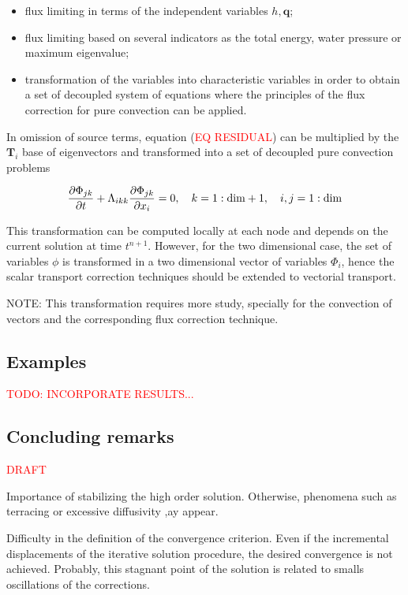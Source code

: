 \begin{itemize}
    \item flux limiting in terms of the independent variables $h, \mathbf{q}$;
    \item flux limiting based on several indicators as the total energy, water pressure or maximum eigenvalue;
    \item transformation of the variables into characteristic variables in order to obtain a set of decoupled system of equations where the principles of the flux correction for pure convection can be applied.
\end{itemize}

In omission of source terms, equation (\textcolor{red}{EQ RESIDUAL}) can be multiplied by the $\mathbf{T}_i$ base of eigenvectors and transformed into a set of decoupled pure convection problems

\begin{equation}
\frac{\partial\Phi_{jk}}{\partial t} + \Lambda_{ikk} \frac{\partial\Phi_{jk}}{\partial x_i} = 0 , \quad
k = 1:\text{dim}+1 , \quad
i,j = 1:\text{dim}
\end{equation}

This transformation can be computed locally at each node and depends on the current solution at time $t^{n+1}$. However, for the two dimensional case, the set of variables $\phi$ is transformed in a two dimensional vector of variables $\Phi_i$, hence the scalar transport correction techniques should be extended to vectorial transport.



NOTE: This transformation requires more study, specially for the convection of vectors and the corresponding flux correction technique.


\subsection{Examples}

\textcolor{red}{TODO: INCORPORATE RESULTS...}


\subsection{Concluding remarks}

\textcolor{red}{DRAFT}

Importance of stabilizing the high order solution. Otherwise, phenomena such as terracing or excessive diffusivity ,ay appear.

Difficulty in the definition of the convergence criterion. Even if the incremental displacements of the iterative solution procedure, the desired convergence is not achieved. Probably, this stagnant point of the solution is related to smalls oscillations of the corrections.

